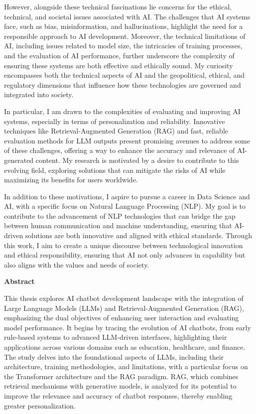 However, alongside these technical fascinations lie concerns for the ethical, technical, and societal issues associated with AI. The challenges that AI systems face, such as bias, misinformation, and hallucinations, highlight the need for a responsible approach to AI development. Moreover, the technical limitations of AI, including issues related to model size, the intricacies of training processes, and the evaluation of AI performance, further underscore the complexity of ensuring these systems are both effective and ethically sound. My curiosity encompasses both the technical aspects of AI and the geopolitical, ethical, and regulatory dimensions that influence how these technologies are governed and integrated into society.

In particular, I am drawn to the complexities of evaluating and improving AI systems, especially in terms of personalization and reliability. Innovative techniques like Retrieval-Augmented Generation (RAG) and fast, reliable evaluation methods for LLM outputs present promising avenues to address some of these challenges, offering a way to enhance the accuracy and relevance of AI-generated content. My research is motivated by a desire to contribute to this evolving field, exploring solutions that can mitigate the risks of AI while maximizing its benefits for users worldwide.

In addition to these motivations, I aspire to pursue a career in Data Science and AI, with a specific focus on Natural Language Processing (NLP). My goal is to contribute to the advancement of NLP technologies that can bridge the gap between human communication and machine understanding, ensuring that AI-driven solutions are both innovative and aligned with ethical standards. Through this work, I aim to create a unique discourse between technological innovation and ethical responsibility, ensuring that AI not only advances in capability but also aligns with the values and needs of society.

\newpage

\begin{center}
    \normalsize\textbf{Abstract}
\end{center}

This thesis explores AI chatbot development landscape with the integration of Large Language Models (LLMs) and Retrieval-Augmented Generation (RAG), emphasizing the dual objectives of enhancing user interaction and evaluating model performance. It begins by tracing the evolution of AI chatbots, from early rule-based systems to advanced LLM-driven interfaces, highlighting their applications across various domains such as education, healthcare, and finance. The study delves into the foundational aspects of LLMs, including their architecture, training methodologies, and limitations, with a particular focus on the Transformer architecture and the RAG paradigm. RAG, which combines retrieval mechanisms with generative models, is analyzed for its potential to improve the relevance and accuracy of chatbot responses, thereby enabling greater personalization.


